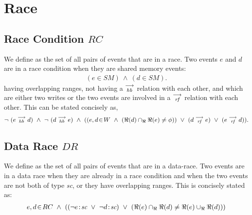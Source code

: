         
    \section{Race}
        
        \subsection{Race Condition $RC$} 
            We define  as the set of all pairs of events that are in a race. Two events $e$ and $d$ are in a race condition when they are shared memory events:
            \begin{align*}
                (e \in SM)\ \wedge\ (d \in SM).
            \end{align*}
            having overlapping ranges, not having a $\stackrel{\longrightarrow}{_\textit{hb}}$ relation with each other, and which are either two writes or the two events are involved in a $\stackrel{\longrightarrow}{_\textit{rf}}$ relation with each other. This can be stated concisely as,
            \begin{align*}
                \neg \ (\reln{e}{hb}{d})\ \wedge\ \neg \ (\reln{d}{hb}{e}) 
                \ \wedge \ 
                (
                (\event{e,d}{W}\  \wedge\ (\Re(d) \cap_{\Re} \Re(e) \neq \phi)) 
                    \  \vee\ (d \stck{_\textit{rf}} e)\ \vee\ (e \stck{_\textit{rf}} d)
                ).
            \end{align*}
                    
        \subsection{Data Race $DR$} 
            We define  as the set of all pairs of events that are in a data-race. Two events are in a data race when they are already in a race condition and when the two events are not both of type \textit{sc}, or they have overlapping ranges. This is concisely stated as:  
            \begin{align*}
                \event{e,d}{RC}  \ \wedge \ 
                ((\neg\et{e}{sc} \ \vee \ \neg\et{d}{sc}) \ \vee \ 
                (\Re(e) \cap_{\Re} \Re(d) \neq \Re(e) \cup_{\Re} \Re(d))) 
            \end{align*}
            
        
